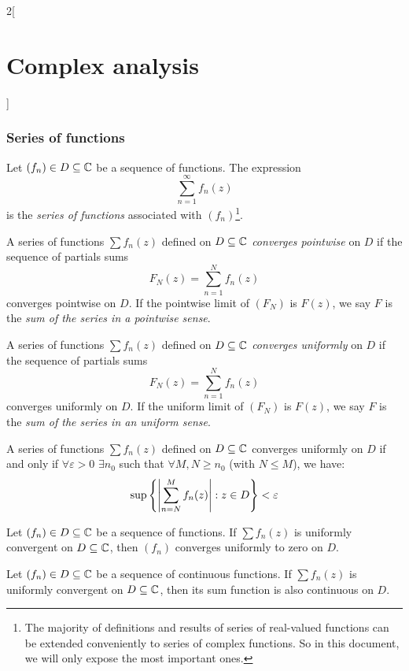 \documentclass[../../../main.tex]{subfiles}
\begin{document}
\begin{multicols}{2}[\section{Complex analysis}]
  \subsubsection{Series of functions}
  \begin{definition}
    Let $(f_n)\in D\subseteq\mathbb{C}$ be a sequence of functions. The expression $$\sum_{n=1}^\infty f_n(z)$$ is the \emph{series of functions} associated with $(f_n)$\footnote{The majority of definitions and results of series of real-valued functions can be extended conveniently to series of complex functions. So in this document, we will only expose the most important ones.}.
  \end{definition}
  \begin{definition}
    A series of functions $\sum f_n(z)$ defined on $D\subseteq\mathbb{C}$ \emph{converges pointwise} on $D$ if the sequence of partials sums $$F_N(z)=\sum_{n=1}^Nf_n(z)$$ converges pointwise on $D$. If the pointwise limit of $(F_N)$ is $F(z)$, we say $F$ is the \emph{sum of the series in a pointwise sense}.
  \end{definition}
  \begin{definition}
    A series of functions $\sum f_n(z)$ defined on $D\subseteq\mathbb{C}$ \emph{converges uniformly} on $D$ if the sequence of partials sums $$F_N(z)=\sum_{n=1}^Nf_n(z)$$ converges uniformly on $D$. If the uniform limit of $(F_N)$ is $F(z)$, we say $F$ is the \emph{sum of the series in an uniform sense}.
  \end{definition}
  \begin{theorem}
    A series of functions $\sum f_n(z)$ defined on $D\subseteq\mathbb{C}$ converges uniformly on $D$ if and only if $\forall\varepsilon>0$ $\exists n_0$ such that $\forall  M, N\geq n_0$ (with $N\leq M$), we have: $$\sup\left\{\abs{\sum_{n=N}^Mf_n(z)}:z\in D\right\}< \varepsilon$$
  \end{theorem}
  \begin{corollary}
    Let $(f_n)\in D\subseteq\mathbb{C}$ be a sequence of functions. If $\sum f_n(z)$ is uniformly convergent on $D\subseteq\mathbb{C}$, then $(f_n)$ converges uniformly to zero on $D$.
  \end{corollary}
  \begin{theorem}
    Let $(f_n)\in D\subseteq\mathbb{C}$ be a sequence of continuous functions. If $\sum f_n(z)$ is uniformly convergent on $D\subseteq\mathbb{C}$, then its sum function is also continuous on $D$.
  \end{theorem}
  \begin{theorem}

\end{theorem}
\end{multicols}
\end{document}
